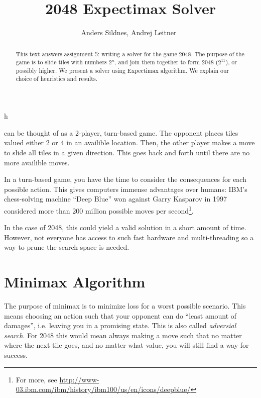 \documentclass[journal]{IEEEtran}
\begin{document}
%
\title{2048 Expectimax Solver}

\author{Anders Sildnes, Andrej Leitner~%
}%

%
{h}

\maketitle

\begin{abstract}
    This text answers assignment 5: writing a solver for the game 2048.
    The purpose of the game is to slide tiles with numbers $2^{n}$, and join them
    together to form 2048 ($2^{11}$), or possibly higher. 
    We present a solver using Expectimax algorithm. We explain our choice of
    heuristics and results.
\end{abstract}

 can be thought of as a 2-player, turn-based game. The
opponent places tiles valued either $2$ or $4$ in an availible location. Then,
the other player makes a move to slide all tiles in a given direction. This
goes back and forth until there are no more availible moves. 

In a turn-based game, you have the time to consider the consequences for each possible
action. This gives computers immense advantages over humans:
IBM's chess-solving machine ``Deep Blue'' won against Garry Kasparov in 1997 considered more than
200 million possible moves per second\footnote{For more, see
    \href{http://www-03.ibm.com/ibm/history/ibm100/us/en/icons/deepblue/}
{http://www-03.ibm.com/ibm/history/ibm100/us/en/icons/deepblue/}}.

In the case of 2048, this could yield a valid solution in a short amount of
time. However, not everyone has access to such fast hardware and
multi-threading so a way to prune the search space is needed.

\section*{Minimax Algorithm}
The purpose of minimax is to minimize loss for a worst possible scenario.
This means choosing an action such that your opponent can do ``least amount of damages'',
i.e. leaving you in a promising state. This is also called \textit{adversial search}.
For 2048 this would mean always making a move such that no matter where the next
tile goes, and no matter what value, you will still find a way for success.
\end{document}
